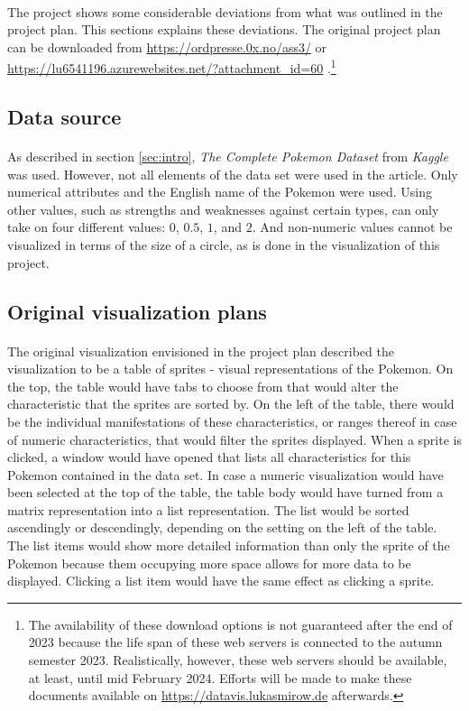 \documentclass[12pt, a4paper]{article}
\begin{document}
		\paragraph{}
			The project shows some considerable deviations from what was outlined in the project plan. This sections explains these deviations. The original project plan can be downloaded from \href{https://ordpresse.0x.no/ass3/}{https://ordpresse.0x.no/ass3/} or \href{https://lu6541196.azurewebsites.net/?attachment\_id=60}{https://lu6541196.azurewebsites.net/?attachment\_id=60} .\footnote{The availability of these download options is not guaranteed after the end of 2023 because the life span of these web servers is connected to the autumn semester 2023. Realistically, however, these web servers should be available, at least, until mid February 2024. Efforts will be made to make these documents available on \href{https://datavis.lukasmirow.de}{https://datavis.lukasmirow.de} afterwards.}
		\subsection{Data source}
			\paragraph{}
				As described in section \ref{sec:intro}, \textit{The Complete Pokemon Dataset} from \textit{Kaggle} was used. However, not all elements of the data set were used in the article. Only numerical attributes and the English name of the Pokemon were used. Using other values, such as strengths and weaknesses against certain types, can only take on four different values: $0$, $0.5$, $1$, and $2$. And non-numeric values cannot be visualized in terms of the size of a circle, as is done in the visualization of this project.
		\subsection{Original visualization plans}\label{sec:ogviz}
			\paragraph{}
				The original visualization envisioned in the project plan described the visualization to be a table of sprites - visual representations of the Pokemon. On the top, the table would have tabs to choose from that would alter the characteristic that the sprites are sorted by. On the left of the table, there would be the individual manifestations of these characteristics, or ranges thereof in case of numeric characteristics, that would filter the sprites displayed. When a sprite is clicked, a window would have opened that lists all characteristics for this Pokemon contained in the data set. In case a numeric visualization would have been selected at the top of the table, the table body would have turned from a matrix representation into a list representation. The list would be sorted ascendingly or descendingly, depending on the setting on the left of the table. The list items would show more detailed information than only the sprite of the Pokemon because them occupying more space allows for more data to be displayed. Clicking a list item would have the same effect as clicking a sprite.
\end{document}
